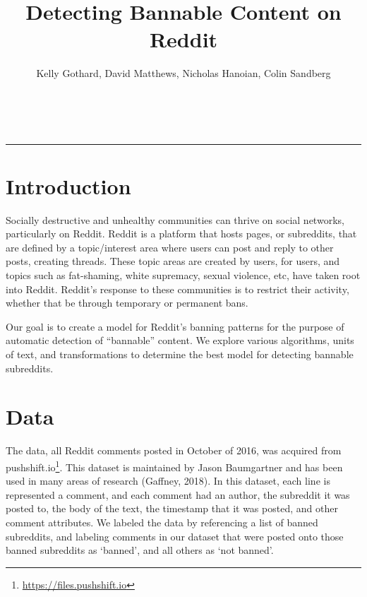 \documentclass[11pt]{article}[twocolumn]
\begin{document}
\title{\textbf{Detecting Bannable Content on Reddit}} \\
\author{Kelly Gothard, David Matthews, Nicholas Hanoian, Colin Sandberg}
\maketitle

\hrule
\section{Introduction}
Socially destructive and unhealthy communities can thrive on social networks, particularly on Reddit.  Reddit is a platform that hosts pages, or subreddits, that are defined by a topic/interest area where users can post and reply to other posts, creating threads.  These topic areas are created by users, for users, and topics such as fat-shaming, white supremacy, sexual violence, etc, have taken root into Reddit.  Reddit's response to these communities is to restrict their activity, whether that be through temporary or permanent bans.

Our goal is to create a model for Reddit's banning patterns for the purpose of automatic detection of ``bannable'' content.  We explore various algorithms, units of text, and transformations to determine the best model for detecting bannable subreddits.

\section{Data}
The data, all Reddit comments posted in October of 2016, was acquired from pushshift.io\footnote{\url{https://files.pushshift.io}}. This dataset is maintained by Jason Baumgartner and has been used in many areas of research (Gaffney, 2018). In this dataset, each line is represented a comment, and each comment had an author, the subreddit it was posted to, the body of the text, the timestamp that it was posted, and other comment attributes.  We labeled the data by referencing a list of banned subreddits, and labeling comments in our dataset that were posted onto those banned subreddits as `banned', and all others as `not banned'.  
\end{document}
